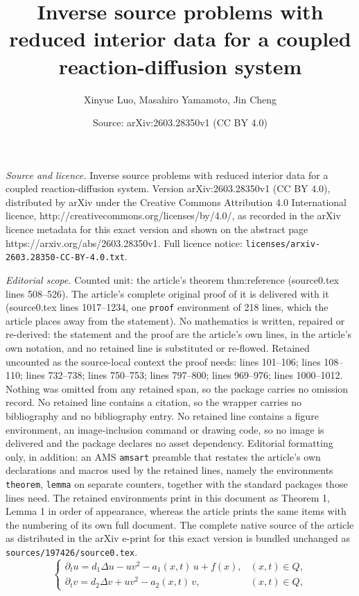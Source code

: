 \documentclass[10pt,a4paper]{amsart}
\title{Inverse source problems with reduced interior data for a coupled reaction-diffusion system}
\author{Xinyue Luo, Masahiro Yamamoto, Jin Cheng}
\date{Source: arXiv:2603.28350v1 (CC BY 4.0)}
\newcommand{\Dt}{\p_t}
\newcommand{\Lap}{\Delta}
\newcommand{\p}{\partial}
\begin{document}
\maketitle

\noindent\emph{Source and licence.} Inverse source problems with reduced interior data for a coupled reaction-diffusion system. Version arXiv:2603.28350v1 (CC BY 4.0), distributed by arXiv under the Creative Commons Attribution 4.0 International licence, http://creativecommons.org/licenses/by/4.0/, as recorded in the arXiv licence metadata for this exact version and shown on the abstract page https://arxiv.org/abs/2603.28350v1. Full licence notice: \texttt{licenses/arxiv-2603.28350-CC-BY-4.0.txt}.\par\smallskip

\noindent\textit{Editorial scope.} Counted unit: the article's theorem thm:reference (source0.tex lines 508--526). The article's complete original proof of it is delivered with it (source0.tex lines 1017--1234, one \texttt{proof} environment of 218 lines, which the article places away from the statement). No mathematics is written, repaired or re-derived: the statement and the proof are the article's own lines, in the article's own notation, and no retained line is substituted or re-flowed.  Retained uncounted as the source-local context the proof needs: lines 101--106; lines 108--110; lines 732--738; lines 750--753; lines 797--800; lines 969--976; lines 1000--1012.  Nothing was omitted from any retained span, so the package carries no omission record.  No retained line contains a citation, so the wrapper carries no bibliography and no bibliography entry.  No retained line contains a figure environment, an image-inclusion command or drawing code, so no image is delivered and the package declares no asset dependency.  Editorial formatting only, in addition: an AMS \texttt{amsart} preamble that restates the article's own declarations and macros used by the retained lines, namely the environments \texttt{theorem}, \texttt{lemma} on separate counters, together with the standard packages those lines need.  The retained environments print in this document as Theorem 1, Lemma 1 in order of appearance, whereas the article prints the same items with the numbering of its own full document.  The complete native source of the article as distributed in the arXiv e-print for this exact version is bundled unchanged as \texttt{sources/197426/source0.tex}.
\begin{equation}\label{eq:forward}
\begin{cases}
\Dt u = d_1 \Lap u - u v^2 - a_1(x,t)\,u + f(x), & (x,t)\in Q,\\[4pt]
\Dt v = d_2 \Lap v + u v^2 - a_2(x,t)\,v, & (x,t)\in Q,
\end{cases}
\end{equation}
\end{document}

